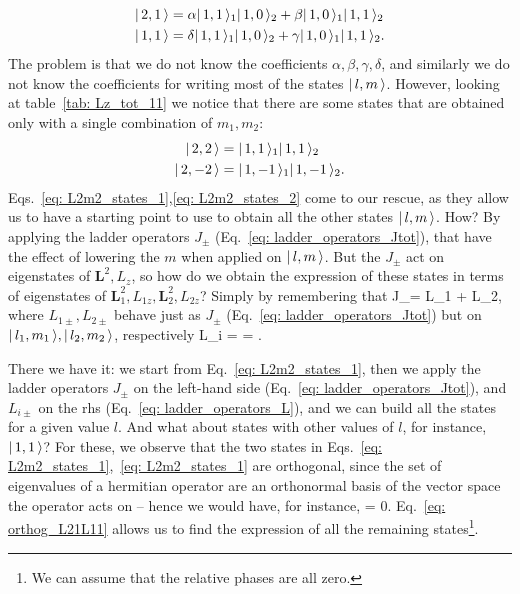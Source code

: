 \begin{align}
    \label{eq: L1_states}
    | \, 2, 1 \, \rangle & = \alpha | \, 1, 1 \, \rangle_1 | \, 1, 0 \, \rangle_2 + \beta | \, 1, 0 \, \rangle_1 | \, 1, 1 \, \rangle_2 \\
    | \, 1, 1 \, \rangle & = \delta | \, 1, 1 \, \rangle_1 | \, 1, 0 \, \rangle_2 + \gamma | \, 1, 0 \, \rangle_1 | \, 1, 1 \, \rangle_2.     
\end{align}
The problem is that we do not know the coefficients $\alpha, \beta, \gamma, \delta$, and similarly we do not know the coefficients for writing most of the states $| \, l, m \, \rangle$. However, looking at table~\ref{tab: Lz_tot_11} we notice that there are some states that are obtained only with a single combination of $m_1, m_2$:
\begin{align}
    | \, 2, 2 \, \rangle & = | \, 1, 1 \, \rangle_1 | \, 1, 1 \, \rangle_2 \label{eq: L2m2_states_1} \\
    | \, 2, -2 \, \rangle & = | \, 1, -1 \, \rangle_1 | \, 1, -1 \, \rangle_2 \label{eq: L2m2_states_2}.
\end{align}
Eqs.~\eqref{eq: L2m2_states_1},\eqref{eq: L2m2_states_2} come to our rescue, as they allow us to have a starting point to use to obtain all the other states $| \, l, m \, \rangle$. How? By applying the ladder operators $J_\pm$ (Eq.~\eqref{eq: ladder_operators_Jtot}), that have the effect of lowering the $m$ when applied on $| \, l, m \, \rangle$. But the $J_\pm$ act on eigenstates of $\bm{L}^2, L_z$, so how do we obtain the expression of these states in terms of eigenstates of $\bm{L}_1^2, L_{1z}, \bm{L}_2^2, L_{2z}$? Simply by remembering that
\be
    \label{eq: JpmLpm}
    J_\pm = L_{1\pm} + L_{2\pm},
\ee
where $L_{1\pm}, L_{2\pm}$ behave just as $J_\pm$ (Eq.~\eqref{eq: ladder_operators_Jtot}) but on $| \, l_1, m_1 \, \rangle, | \, l_2, m_2 \, \rangle$, respectively
\be
    \label{eq: ladder_operators_L}
    L_{i \pm} =  = \hbar {} .
\ee

There we have it: we start from Eq.~\eqref{eq: L2m2_states_1}, then we apply the ladder operators $J_\pm$ on the left-hand side (Eq.~\eqref{eq: ladder_operators_Jtot}), and $L_{i \pm}$ on the rhs (Eq.~\eqref{eq: ladder_operators_L}), and we can build all the states for a given value $l$. And what about states with other values of $l$, for instance, $| \, 1, 1 \, \rangle$? For these, we observe that the two states in Eqs.~\eqref{eq: L2m2_states_1},~\eqref{eq: L2m2_states_1} are orthogonal, since the set of eigenvalues of a hermitian operator are an orthonormal basis of the vector space the operator acts on -- hence we would have, for instance,
\be
    \label{eq: orthog_L21L11}
     = 0.
\ee
Eq.~\eqref{eq: orthog_L21L11} allows us to find the expression of all the remaining states\footnote{We can assume that the relative phases are all zero.}.

